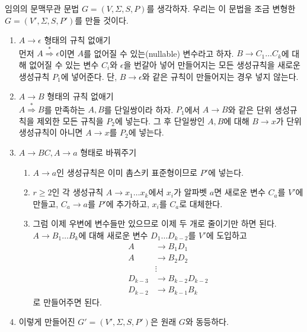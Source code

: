 \documentclass[b5paper, 11pt]{book}
\theoremstyle{definition}
\newenvironment{pf*}{\pushQED{\qed}\pf}
{\popQED\endpf}
\begin{document}
\begin{pf*}
    임의의 문맥무관 문법 $G = (V, \Sigma, S, P)$를 생각하자. 우리는 이 문법을
    조금 변형한 $G = (V', \Sigma, S, P')$를 만들 것이다. 
    \begin{enumerate}
        \item $A \rightarrow \epsilon$ 형태의 규칙 없애기 \\ 
        먼저 $A \overset{*}{\Rightarrow} \epsilon$이면 $A$를 없어질 수 있는(nullable) 변수라고 하자. $B \rightarrow C_1 \ldots C_k$에 대해 없어질 수 있는 변수 $C_i$와 $\epsilon$을 번갈아 넣어 만들어지는 모든 생성규칙을 새로운 생성규칙 $P_1$에 넣어준다. 단, $B \rightarrow \epsilon$와 같은 규칙이 만들어지는 경우 넣지 않는다. 
        \item $A\rightarrow B$ 형태의 규칙 없애기 \\ 
        $A \overset{*}{\Rightarrow} B$를 만족하는 $A, B$를 단일쌍이라 하자. $P_1$에서 $A \rightarrow B$와 같은 단위 생성규칙을 제외한 모든 규칙을 $P_2$에 넣는다. 그 후 단일쌍인 $A, B$에 대해 $B \rightarrow x$가 단위 생성규칙이 아니면 $A \rightarrow x$를
        $P_2$에 넣는다.
        \item $A \rightarrow BC, A \rightarrow a$ 형태로 바꿔주기
        \begin{enumerate}
            \item $A \rightarrow a$인 생성규칙은 이미 촘스키 표준형이므로 $P'$에 넣는다.
            \item $r \ge 2$인 각 생성규칙 $A \rightarrow x_1 \ldots x_k$에서 $x_i$가 알파벳 $a$면 새로운 변수 $C_a$를 $V'$에 만들고, $C_a \rightarrow a$를 $P'$에 추가하고, $x_i$를 $C_a$로 대체한다.
            \item 그럼 이제 우변에 변수들만 있으므로 이제 두 개로 줄이기만 하면 된다. $A \rightarrow B_1 \ldots B_k$에 대해 새로운 변수 $D_1 \ldots D_{k-2}$를 $V'$에 도입하고 
            \begin{align*}
                A & \rightarrow B_1 D_1 \\ 
                A & \rightarrow B_2 D_2 \\ 
                &\vdots \\ 
                D_{k-3} &\rightarrow B_{k-2}D_{k-2} \\ 
                D_{k-2} &\rightarrow B_{k-1}B_{k}
            \end{align*}
            로 만들어주면 된다.
        \end{enumerate}
        \item 이렇게 만들어진 $G'= (V', \Sigma, S, P' )$은 원래 $G$와 동등하다. 
    \end{enumerate} 
\end{pf*}
\end{document}
